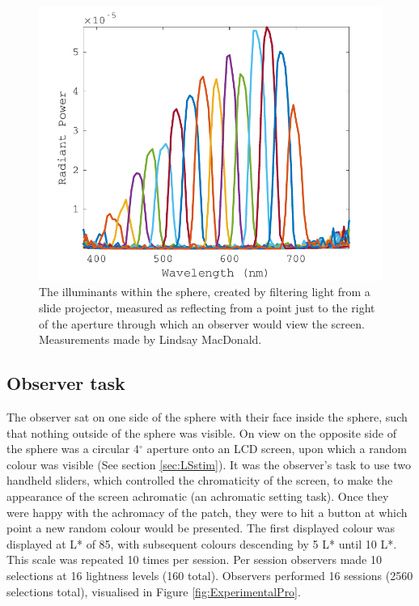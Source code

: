 \begin{figure}[htbp]
\includegraphics[max width=\textwidth]{figs/LargeSphere/LSillum.pdf}
\caption{The illuminants within the sphere, created by filtering light from a slide projector, measured as reflecting from a point just to the right of the aperture through which an observer would view the screen. Measurements made by Lindsay MacDonald.} %
\label{fig:LSillum}
\end{figure}

\subsection{Observer task}

The observer sat on one side of the sphere with their face inside the sphere, such that nothing outside of the sphere was visible. On view on the opposite side of the sphere was a circular 4$^{\circ}$ aperture onto an LCD screen, upon which a random colour %
was visible (See section \ref{sec:LSstim}). It was the observer's task to use two handheld sliders, which controlled the chromaticity of the screen, to make the appearance of the screen achromatic (an achromatic setting task). Once they were happy with the achromacy of the patch, they were to hit a button at which point a new random colour would be presented. The first displayed colour was displayed at L* of 85, with subsequent colours descending by 5 L* until 10 L*. This scale was repeated 10 times per session. Per session observers made 10 selections at 16 lightness levels (160 total). Observers performed 16 sessions (2560 selections total), visualised in Figure \ref{fig:ExperimentalPro}.


